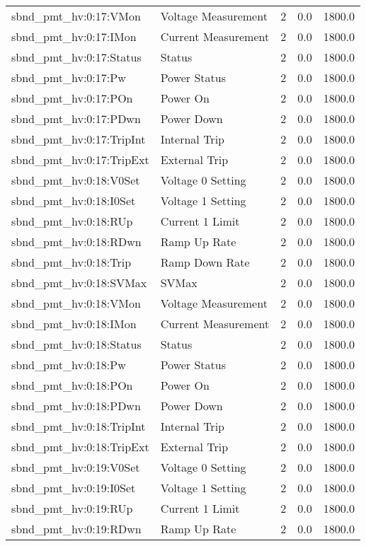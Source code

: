 \begin{center}
\begin{longtable}{l | l l l l }
sbnd\_pmt\_hv:0:17:VMon & Voltage Measurement & 2 & 0.0 & 1800.0\\ 
sbnd\_pmt\_hv:0:17:IMon & Current Measurement & 2 & 0.0 & 1800.0\\ 
sbnd\_pmt\_hv:0:17:Status & Status & 2 & 0.0 & 1800.0\\ 
sbnd\_pmt\_hv:0:17:Pw & Power Status & 2 & 0.0 & 1800.0\\ 
sbnd\_pmt\_hv:0:17:POn & Power On & 2 & 0.0 & 1800.0\\ 
sbnd\_pmt\_hv:0:17:PDwn & Power Down & 2 & 0.0 & 1800.0\\ 
sbnd\_pmt\_hv:0:17:TripInt & Internal Trip & 2 & 0.0 & 1800.0\\ 
sbnd\_pmt\_hv:0:17:TripExt & External Trip & 2 & 0.0 & 1800.0\\ 
sbnd\_pmt\_hv:0:18:V0Set & Voltage 0 Setting & 2 & 0.0 & 1800.0\\ 
sbnd\_pmt\_hv:0:18:I0Set & Voltage 1 Setting & 2 & 0.0 & 1800.0\\ 
sbnd\_pmt\_hv:0:18:RUp & Current 1 Limit & 2 & 0.0 & 1800.0\\ 
sbnd\_pmt\_hv:0:18:RDwn & Ramp Up Rate & 2 & 0.0 & 1800.0\\ 
sbnd\_pmt\_hv:0:18:Trip & Ramp Down Rate & 2 & 0.0 & 1800.0\\ 
sbnd\_pmt\_hv:0:18:SVMax & SVMax & 2 & 0.0 & 1800.0\\ 
sbnd\_pmt\_hv:0:18:VMon & Voltage Measurement & 2 & 0.0 & 1800.0\\ 
sbnd\_pmt\_hv:0:18:IMon & Current Measurement & 2 & 0.0 & 1800.0\\ 
sbnd\_pmt\_hv:0:18:Status & Status & 2 & 0.0 & 1800.0\\ 
sbnd\_pmt\_hv:0:18:Pw & Power Status & 2 & 0.0 & 1800.0\\ 
sbnd\_pmt\_hv:0:18:POn & Power On & 2 & 0.0 & 1800.0\\ 
sbnd\_pmt\_hv:0:18:PDwn & Power Down & 2 & 0.0 & 1800.0\\ 
sbnd\_pmt\_hv:0:18:TripInt & Internal Trip & 2 & 0.0 & 1800.0\\ 
sbnd\_pmt\_hv:0:18:TripExt & External Trip & 2 & 0.0 & 1800.0\\ 
sbnd\_pmt\_hv:0:19:V0Set & Voltage 0 Setting & 2 & 0.0 & 1800.0\\ 
sbnd\_pmt\_hv:0:19:I0Set & Voltage 1 Setting & 2 & 0.0 & 1800.0\\ 
sbnd\_pmt\_hv:0:19:RUp & Current 1 Limit & 2 & 0.0 & 1800.0\\ 
sbnd\_pmt\_hv:0:19:RDwn & Ramp Up Rate & 2 & 0.0 & 1800.0\\ 

\end{longtable}
\end{center}
